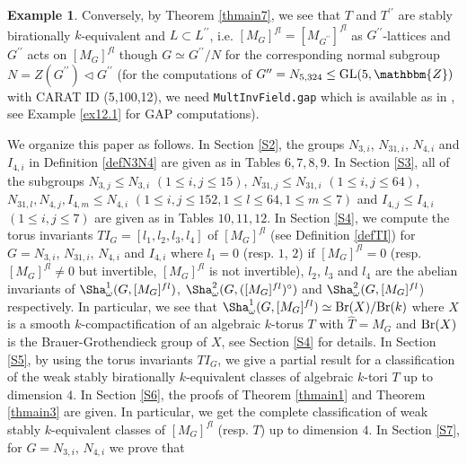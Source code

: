\documentclass{amsart}
\theoremstyle{plain}
\theoremstyle{definition}
\newtheorem{example}[theorem]{Example}
\theoremstyle{remark}
\newcommand{\bZ}{\mathbbm{Z}}\newcommand{\bQ}{\mathbbm{Q}}
\newcommand{\GL}{{\rm GL}}\newcommand{\SL}{{\rm SL}}
\newcounter{sub}\def\tr{\mbox{tr }}
\begin{document}
\begin{example}
Conversely, by Theorem \ref{thmain7}, 
we see that 
$T$ and $T^{\prime\prime}$ are stably birationally $k$-equivalent 
and $L\subset L^{\prime\prime}$, i.e. 
$[M_G]^{fl}=[M_{G^{\prime\prime}}]^{fl}$ as $G^{\prime\prime}$-lattices 
and $G^{\prime\prime}$ acts on $[M_G]^{fl}$ though 
$G\simeq G^{\prime\prime}/N$ for the corresponding normal subgroup 
$N=Z(G^{\prime\prime})\lhd G^{\prime\prime}$ 
(for the computations of $G^{\prime\prime}=N_{5,324}\leq \GL(5,\bZ)$ 
with CARAT ID (5,100,12), we need {\tt MultInvField.gap} 
which is available as in \cite{MultInvField}, 
see Example \ref{ex12.1} for GAP computations). 
\end{example}

We organize this paper as follows. 
In Section \ref{S2}, 
the groups $N_{3,i}$, $N_{31,i}$, $N_{4,i}$ and $I_{4,i}$ 
in Definition \ref{defN3N4} are given as in Tables $6, 7, 8, 9$. 
In Section \ref{S3}, 
all of the subgroups 
$N_{3,j}\leq N_{3,i}$ $(1\leq i,j\leq 15)$, 
$N_{31,j}\leq N_{31,i}$ $(1\leq i,j\leq 64)$, 
$N_{31,l}, N_{4,j}, I_{4,m}\leq N_{4,i}$ 
$(1\leq i,j\leq 152, 1\leq l\leq 64, 1\leq m\leq 7)$ and 
$I_{4,j}\leq I_{4,i}$ $(1\leq i,j\leq 7)$ 
are given as in Tables $10, 11, 12$. 
In Section \ref{S4}, 
we compute the torus invariants $TI_G=[l_1,l_2,l_3,l_4]$ of $[M_G]^{fl}$ 
(see Definition \ref{defTI}) 
for $G=N_{3,i}$, $N_{31,i}$, $N_{4,i}$ and $I_{4,i}$ 
where $l_1=0$ (resp. $1$, $2$) if 
$[M_G]^{fl}=0$ (resp. $[M_G]^{fl}\neq 0$ but invertible, 
$[M_G]^{fl}$ is not invertible), 
$l_2$, $l_3$ and $l_4$ are 
the abelian invariants of 
$\Sha^1_\omega(G,[M_G]^{fl})$, 
$\Sha^2_\omega(G,([M_G]^{fl})^\circ)$ and 
$\Sha^2_\omega(G,[M_G]^{fl}$) respectively. 
In particular, we see that 
$\Sha^1_\omega(G,[M_G]^{fl})\simeq {\rm Br}(X)/{\rm Br}(k)$ 
where $X$ is a smooth $k$-compactification of an algebraic $k$-torus $T$ 
with $\widehat{T}=M_G$ 
and ${\rm Br}(X)$ is the Brauer-Grothendieck group of $X$, 
see Section \ref{S4} for details. 
In Section \ref{S5}, by using the torus invariants $TI_G$, 
we give a partial result for a classification of 
the weak stably birationally $k$-equivalent classes 
of algebraic $k$-tori $T$ up to dimension $4$.
%
In Section \ref{S6}, 
the proofs of {Theorem \ref{thmain1}} and {Theorem \ref{thmain3}} are given. 
In particular, we get the complete classification of 
weak stably $k$-equivalent classes of $[M_G]^{fl}$ (resp. $T$) 
up to dimension $4$. 
%
In Section \ref{S7}, 
for $G=N_{3,i}$, $N_{4,i}$ 
we prove that 
\end{document}
